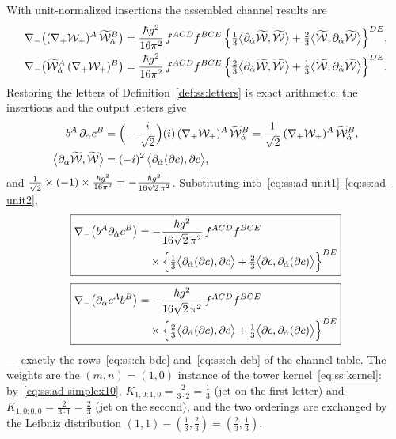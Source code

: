 With unit-normalized insertions the assembled channel results are
\begin{align}
\nabla_{-}\big((\nabla_{+}\mathcal{W}_{+})^{A}\,\widetilde{\mathcal{W}}_{\dot\alpha}^{B}\big)
&=\frac{\hbar g^{2}}{16\pi^{2}}\,f^{ACD}f^{BCE}\,
\Big\{\tfrac13\big\langle\partial_{\dot\alpha}\widetilde{\mathcal{W}},\widetilde{\mathcal{W}}\big\rangle
+\tfrac23\big\langle\widetilde{\mathcal{W}},\partial_{\dot\alpha}\widetilde{\mathcal{W}}\big\rangle\Big\}^{DE},
\label{eq:ss:ad-unit1}\\
\nabla_{-}\big(\widetilde{\mathcal{W}}_{\dot\alpha}^{A}\,(\nabla_{+}\mathcal{W}_{+})^{B}\big)
&=\frac{\hbar g^{2}}{16\pi^{2}}\,f^{ACD}f^{BCE}\,
\Big\{\tfrac23\big\langle\partial_{\dot\alpha}\widetilde{\mathcal{W}},\widetilde{\mathcal{W}}\big\rangle
+\tfrac13\big\langle\widetilde{\mathcal{W}},\partial_{\dot\alpha}\widetilde{\mathcal{W}}\big\rangle\Big\}^{DE}.
\label{eq:ss:ad-unit2}
\end{align}
Restoring the letters of Definition~\ref{def:ss:letters} is exact arithmetic:
the insertions and the output letters give
\begin{align}
b^{A}\,\partial_{\dot\alpha}c^{B}
&=\Big(-\frac{i}{\sqrt2}\Big)(i)\,
(\nabla_{+}\mathcal{W}_{+})^{A}\,\widetilde{\mathcal{W}}_{\dot\alpha}^{B}
=\frac{1}{\sqrt2}\,(\nabla_{+}\mathcal{W}_{+})^{A}\,\widetilde{\mathcal{W}}_{\dot\alpha}^{B},
\notag\\
\big\langle\partial_{\dot\alpha}\widetilde{\mathcal{W}},\widetilde{\mathcal{W}}\big\rangle
&=(-i)^{2}\,\big\langle\partial_{\dot\alpha}(\partial c),\partial c\big\rangle ,
\label{eq:ss:ad-restore}
\end{align}
and $\frac{1}{\sqrt2}\times(-1)\times\frac{\hbar g^{2}}{16\pi^{2}}
=-\frac{\hbar g^{2}}{16\sqrt2\,\pi^{2}}$. Substituting
into~\eqref{eq:ss:ad-unit1}--\eqref{eq:ss:ad-unit2},
\begin{equation}\label{eq:ss:ad-bdc}
\boxed{\begin{aligned}
\nabla_{-}\big(b^{A}\partial_{\dot\alpha}c^{B}\big)
&=-\frac{\hbar g^{2}}{16\sqrt2\,\pi^{2}}\,f^{ACD}f^{BCE}\\
&\quad\times
\Big\{\tfrac13\big\langle\partial_{\dot\alpha}(\partial c),\partial c\big\rangle
+\tfrac23\big\langle\partial c,\partial_{\dot\alpha}(\partial c)\big\rangle
\Big\}^{DE}
\end{aligned}}
\end{equation}
\begin{equation}\label{eq:ss:ad-dcb}
\boxed{\begin{aligned}
\nabla_{-}\big(\partial_{\dot\alpha}c^{A}b^{B}\big)
&=-\frac{\hbar g^{2}}{16\sqrt2\,\pi^{2}}\,f^{ACD}f^{BCE}\\
&\quad\times
\Big\{\tfrac23\big\langle\partial_{\dot\alpha}(\partial c),\partial c\big\rangle
+\tfrac13\big\langle\partial c,\partial_{\dot\alpha}(\partial c)\big\rangle
\Big\}^{DE}
\end{aligned}}
\end{equation}
--- exactly the rows~\eqref{eq:ss:ch-bdc} and~\eqref{eq:ss:ch-dcb} of the
channel table. The weights are the $(m,n)=(1,0)$ instance of the tower
kernel~\eqref{eq:ss:kernel}: by~\eqref{eq:ss:ad-simplex10},
$K_{1,0;1,0}=\frac{2}{3\cdot2}=\frac13$ (jet on the first letter) and
$K_{1,0;0,0}=\frac{2}{3\cdot1}=\frac23$ (jet on the second), and the two
orderings are exchanged by the Leibniz distribution
$(1,1)-(\tfrac13,\tfrac23)=(\tfrac23,\tfrac13)$.


